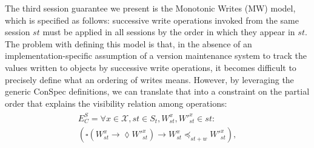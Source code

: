 \documentclass[journal,compsoc]{IEEEtran}
\begin{document}
The third session guarantee we present is the Monotonic Writes (MW) model, which is specified as follows: successive write operations invoked from the same session $st$ must be applied in all sessions by the order in which they appear in $st$. The problem with defining this model is that, in the absence of an implementation-specific assumption of a version maintenance system to track the values written to objects by successive write operations, it becomes difficult to precisely define what an ordering of writes means. However, by leveraging the generic ConSpec definitions, we can translate that into a constraint on the partial order that explains the visibility relation among operations:
  \begin{align}\label{eqn:MW}
\begin{split}
  E^S_C =   \forall x \in \mathcal{X}, \mathit{st} \in \mathit{S_t}, W_\mathit{st}^x, W'^x_\mathit{st} \in \mathit{st}: \\ \left( \square \left( W_\mathit{st}^x \rightarrow \lozenge W'^{x}_\mathit{st} \right)
 \rightarrow W_\mathit{st}^x \preccurlyeq_{\mathit{st}+w} W'^{x}_\mathit{st} \right),

\end{split}
\end{align}
\end{document}
